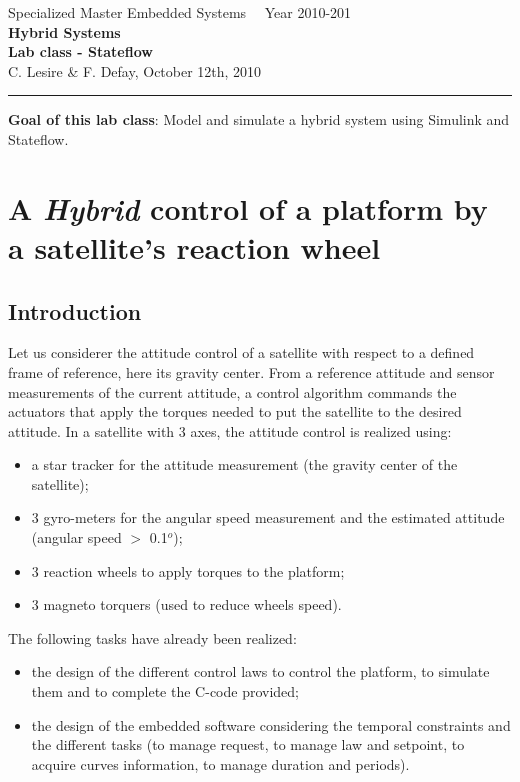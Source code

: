 \documentclass[a4paper]{article}
\begin{document}
\begin{center}
Specialized Master Embedded Systems ~~\hfill Year 2010-201\\
\vspace{.3cm}
{\large \bf Hybrid Systems\\
 Lab class - Stateflow\\
}
C. Lesire \& F. Defay, October 12th, 2010
\end{center}
\vspace{.1cm}
\hrule
\vspace{.2cm}
{\bf Goal of this lab class}:
Model and simulate a hybrid system using Simulink and Stateflow.
\tableofcontents

\section{A {\it Hybrid} control of a platform by a satellite's reaction wheel}

\subsection{Introduction}

Let us considerer the attitude control of a satellite with respect to a defined frame of reference,
here its gravity center. From a reference attitude  and sensor measurements of the current
attitude, a control algorithm commands the actuators that apply the torques needed to put the
satellite to the desired attitude.
In a satellite with 3 axes, the attitude control is realized using:
\begin{itemize}
\item a star tracker for the attitude measurement (the gravity center of the satellite);
\item 3 gyro-meters for the angular speed measurement and the estimated attitude (angular speed $>$ 0.1$^o$);
\item 3 reaction wheels to apply torques to the platform;
\item 3 magneto torquers (used to reduce wheels speed).
\end{itemize}

The following tasks have already been realized:
\begin{itemize}
\item the design of the different control laws to control the platform, to simulate them and 
to complete the C-code provided;
\item the design of the embedded software considering the temporal constraints and the 
different tasks (to manage request, to manage law and setpoint, to acquire curves information, 
to manage duration and periods).
\end{itemize}
\end{document}
